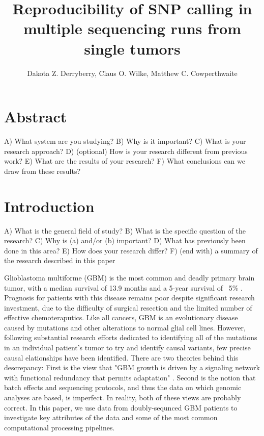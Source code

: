 \documentclass[11pt]{article} %
\title{Reproducibility of SNP calling in multiple sequencing runs from single tumors}
\author{Dakota Z. Derryberry, Claus O. Wilke, Matthew C. Cowperthwaite}
\begin{document}
\maketitle

\section{Abstract}

A) What system are you studying?
B) Why is it important?
C) What is your research approach?
D) (optional) How is your research different from previous work?
E) What are the results of your research?
F) What conclusions can we draw from these results?

\section{Introduction}

A) What is the general field of study?
B) What is the specific question of the research?
C) Why is (a) and/or (b) important?
D) What has previously been done in this area?
E) How does your research differ?
F) (end with) a summary of the research described in this paper

Glioblastoma multiforme (GBM) is the most common and deadly primary brain tumor, with a median survival of 13.9 months and a 5-year survival of ~5\% \cite{TCGA-GBM-13}. Prognosis for patients with this disease remains poor despite significant research investment, due to the difficulty of surgical resection and the limited number of effective chemoteraputics. Like all cancers, GBM is an evolutionary disease caused by mutations and other alterations to normal glial cell lines. However, following substantial research efforts dedicated to identifying all of the mutations in an individual patient's tumor to try and identify causal variants, few precise causal elationships have been identified. There are two theories behind this descrepancy: First is the view that "GBM growth is driven by a signaling network with functional redundancy that permits adaptation" \cite{TCGA-GBM-13}. Second is the notion that batch effects and sequencing protocols, and thus the data on which genomic analyses are based, is imperfect. In reality, both of these views are probably correct. In this paper, we use data from doubly-sequnced GBM patients to investigate key attributes of the data and some of the most common computational processing pipelines.
\end{document}

